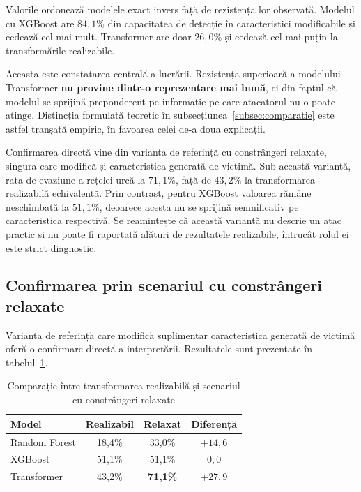 Valorile ordonează modelele exact invers față de rezistența lor observată. Modelul cu XGBoost are $84{,}1\%$ din capacitatea de detecție în caracteristici modificabile și cedează cel mai mult. Transformer are doar $26{,}0\%$ și cedează cel mai puțin la transformările realizabile.

Aceasta este constatarea centrală a lucrării. Rezistența superioară a modelului Transformer \textbf{nu provine dintr-o reprezentare mai bună}, ci din faptul că modelul se sprijină preponderent pe informație pe care atacatorul nu o poate atinge. Distincția formulată teoretic în subsecțiunea~\ref{subsec:comparatie} este astfel tranșată empiric, în favoarea celei de-a doua explicații.

Confirmarea directă vine din varianta de referință cu constrângeri relaxate, singura care modifică și caracteristica generată de victimă. Sub această variantă, rata de evaziune a rețelei urcă la $71{,}1\%$, față de $43{,}2\%$ la transformarea realizabilă echivalentă. Prin contrast, pentru XGBoost valoarea rămâne neschimbată la $51{,}1\%$, deoarece acesta nu se sprijină semnificativ pe caracteristica respectivă. Se reamintește că această variantă nu descrie un atac practic și nu poate fi raportată alături de rezultatele realizabile, întrucât rolul ei este strict diagnostic.

\subsection{Confirmarea prin scenariul cu constrângeri relaxate}\label{subsec:relaxat}

Varianta de referință care modifică suplimentar caracteristica generată de victimă oferă o confirmare directă a interpretării. Rezultatele sunt prezentate în tabelul~\ref{tab:relaxat}.

\begin{table}[!ht]
    \caption{Comparație între transformarea realizabilă și scenariul cu constrângeri relaxate}
    \centering
    \begin{tabular}{|l|c|c|c|}
        \hline
        \textbf{Model} & \textbf{Realizabil} & \textbf{Relaxat} & \textbf{Diferență} \\
        \hline
        Random Forest & 18,4\% & 33,0\% & $+14{,}6$ \\
        \hline
        XGBoost & 51,1\% & 51,1\% & \textbf{$0{,}0$} \\
        \hline
        Transformer & 43,2\% & \textbf{71,1\%} & \textbf{$+27{,}9$} \\
        \hline
    \end{tabular}
    \label{tab:relaxat}
\end{table}

